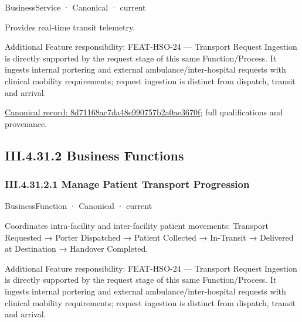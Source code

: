 \label{element:8d71168ac7da48e990757b2a0ae3670f}
{\small BusinessService · Canonical · current}\par

Provides real-time transit telemetry.



Additional Feature responsibility: FEAT-HSO-24 — Transport Request Ingestion is directly supported by the request stage of this same Function/Process. It ingests internal portering and external ambulance/inter-hospital requests with clinical mobility requirements; request ingestion is distinct from dispatch, transit and arrival.


{\footnotesize \href{../../../../continuum/business/business-service/8d71168ac7da48e990757b2a0ae3670f.md}{Canonical record: 8d71168ac7da48e990757b2a0ae3670f}; full qualifications and provenance.}\par
\subsection*{III.4.31.2 Business Functions}
\label{navigation:III.4.31.2}

\subsubsection*{III.4.31.2.1 Manage Patient Transport Progression}
\label{navigation:III.4.31.2.1}

\label{element:8a2136544646458fb60413afed2b66e1}
{\small BusinessFunction · Canonical · current}\par

Coordinates intra-facility and inter-facility patient movements: Transport Requested → Porter Dispatched → Patient Collected → In-Transit → Delivered at Destination → Handover Completed.



Additional Feature responsibility: FEAT-HSO-24 — Transport Request Ingestion is directly supported by the request stage of this same Function/Process. It ingests internal portering and external ambulance/inter-hospital requests with clinical mobility requirements; request ingestion is distinct from dispatch, transit and arrival.


